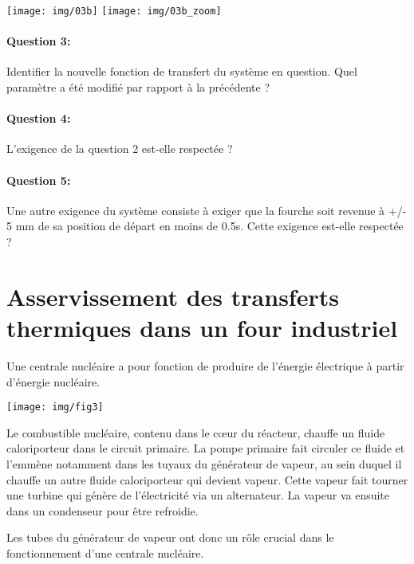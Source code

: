 \begin{center}
 \texttt{[image: img/03b]}
 \texttt{[image: img/03b\_zoom]}
\end{center}

\paragraph{Question 3:} Identifier la nouvelle fonction de transfert du système en question. Quel paramètre a été modifié par rapport à la précédente ?

\paragraph{Question 4:} L'exigence de la question 2 est-elle respectée ?

\paragraph{Question 5:} Une autre exigence du système consiste à exiger que la fourche soit revenue à +/- 5 mm de sa position de départ en moins de 0.5s. Cette exigence est-elle respectée ?

\newpage

\section{Asservissement des transferts thermiques dans un four industriel}

Une centrale nucléaire a pour fonction de produire de l'énergie électrique à partir d'énergie nucléaire.

\begin{center}
 \texttt{[image: img/fig3]}
\end{center}

Le combustible nucléaire, contenu dans le c\oe ur du réacteur, chauffe un fluide caloriporteur dans le circuit primaire. La pompe primaire fait circuler ce fluide et l'emmène notamment dans les tuyaux du générateur de vapeur, au sein duquel il chauffe un autre fluide caloriporteur qui devient vapeur. Cette vapeur fait tourner une turbine qui génère de l'électricité via un alternateur. La vapeur va ensuite dans un condenseur pour être refroidie.

Les tubes du générateur de vapeur ont donc un rôle crucial dans le fonctionnement d'une centrale nucléaire.

\vfill


